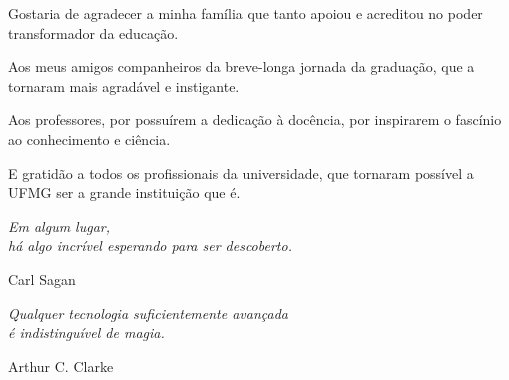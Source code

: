 \begin{agradecimentos}

Gostaria de agradecer a minha família que tanto apoiou e acreditou no poder transformador da educação.

Aos meus amigos companheiros da breve-longa jornada da graduação, que a tornaram mais agradável e instigante.

Aos professores, por possuírem a dedicação à docência, por inspirarem o fascínio ao conhecimento e ciência.

E gratidão a todos os profissionais da universidade, que tornaram possível a UFMG ser a grande instituição que é.



\end{agradecimentos}

\begin{epigrafe}
    \vspace*{\fill}
	\begin{flushright}
		\textit{Em algum lugar, \\ há algo incrível esperando para ser descoberto.}
        
        Carl Sagan

		\textit{Qualquer tecnologia suficientemente avançada \\
		é indistinguível de magia.}
        
        Arthur C. Clarke
	\end{flushright}
\end{epigrafe}
